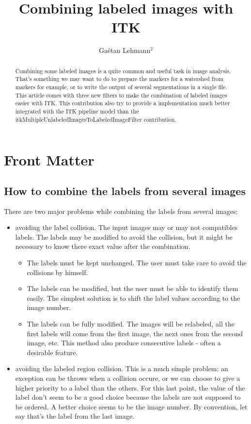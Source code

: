 \documentclass{InsightArticle}
\title{Combining labeled images with ITK}
\author{Ga\"etan Lehmann{$^2$}}
\begin{document}
\maketitle

\ifhtml
\chapter*{Front Matter\label{front}}
\fi


\begin{abstract}
\noindent
Combining some labeled images is a quite common and useful task in image analysis.
That's something we may want to do to prepare the markers for a watershed from
markers for example, or to write the output of several segmentations in a single
file.
This article comes with three new filters to make the combination
of labeled images easier with ITK.
This contribution also try to provide a implementation much better integrated with the
ITK pipeline model than the itkMultipleUnlabeledImagesToLabeledImageFilter contribution.
\end{abstract}

\section{How to combine the labels from several images}

There are two major problems while combining the labels from several images:
\begin{itemize}
  \item avoiding the label collision. The input images may or may not compatibles labels.
  The labels may be modified to avoid the collision, but it might be necessary to know
  there exact value after the combination.
  \begin{itemize}
    \item The labels must be kept unchanged. The user must take care to avoid the collisions
    by himself.
    \item The labels can be modified, but the user must be able to identify them easily. The
    simplest solution is to shift the label values according to the image number.
    \item The labels can be fully modified. The images will be relabeled, all the first labels
    will come from the first image, the next ones from the second image, etc. This method also
    produce consecutive labels - often a desirable feature.
  \end{itemize}

  \item avoiding the labeled region collision. This is a much simple problem: an exception
  can be throws when a collision occure, or we can choose to give a higher priority to a
  label than the others. For this last point, the value of the label don't seem to be a good choice
  because the labels are not supposed to be ordered. A better choice seems to be the image
  number. By convention, let say that's the label from the last image.
  
\end{itemize}
\end{document}
